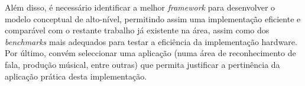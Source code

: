 \documentclass[a4paper, onecolumn, 10pt]{article}
\begin{document}
	Além disso, é necessário identificar a melhor \textit{framework} para desenvolver o modelo conceptual de alto-nível, permitindo assim uma implementação eficiente e comparável com o restante trabalho já existente na área, assim como dos \textit{benchmarks} mais adequados para testar a eficiência da implementação hardware. Por último, convém seleccionar uma aplicação (numa área de reconhecimento de fala, produção músical, entre outras) que permita justificar a pertinência da aplicação prática desta implementação.

	\printbibliography
\end{document}
